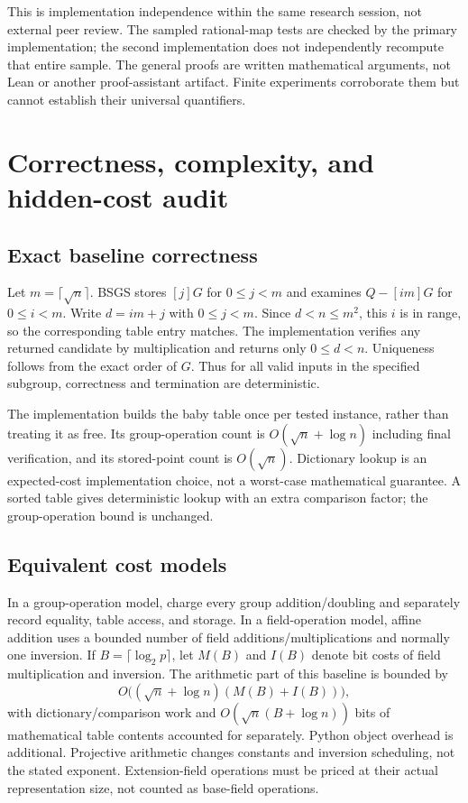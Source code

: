 \documentclass[11pt,letterpaper]{article}
\theoremstyle{definition}
\theoremstyle{remark}
\begin{document}
This is implementation independence within the same research session, not external peer review. The sampled rational-map tests are checked by the primary implementation; the second implementation does not independently recompute that entire sample. The general proofs are written mathematical arguments, not Lean or another proof-assistant artifact. Finite experiments corroborate them but cannot establish their universal quantifiers.

\section{Correctness, complexity, and hidden-cost audit}\label{sec:cost}

\subsection{Exact baseline correctness}

Let $m=\lceil\sqrt n\rceil$. BSGS stores $[j]G$ for $0\le j<m$ and examines $Q-[im]G$ for $0\le i<m$. Write $d=im+j$ with $0\le j<m$. Since $d<n\le m^2$, this $i$ is in range, so the corresponding table entry matches. The implementation verifies any returned candidate by multiplication and returns only $0\le d<n$. Uniqueness follows from the exact order of $G$. Thus for all valid inputs in the specified subgroup, correctness and termination are deterministic.

The implementation builds the baby table once per tested instance, rather than treating it as free. Its group-operation count is $O(\sqrt n+\log n)$ including final verification, and its stored-point count is $O(\sqrt n)$. Dictionary lookup is an expected-cost implementation choice, not a worst-case mathematical guarantee. A sorted table gives deterministic lookup with an extra comparison factor; the group-operation bound is unchanged.

\subsection{Equivalent cost models}

In a group-operation model, charge every group addition/doubling and separately record equality, table access, and storage. In a field-operation model, affine addition uses a bounded number of field additions/multiplications and normally one inversion. If $B=\lceil\log_2p\rceil$, let $M(B)$ and $I(B)$ denote bit costs of field multiplication and inversion. The arithmetic part of this baseline is bounded by
\[
O\big((\sqrt n+\log n)(M(B)+I(B))\big),
\]
with dictionary/comparison work and $O(\sqrt n(B+\log n))$ bits of mathematical table contents accounted for separately. Python object overhead is additional. Projective arithmetic changes constants and inversion scheduling, not the stated exponent. Extension-field operations must be priced at their actual representation size, not counted as base-field operations.
\end{document}
